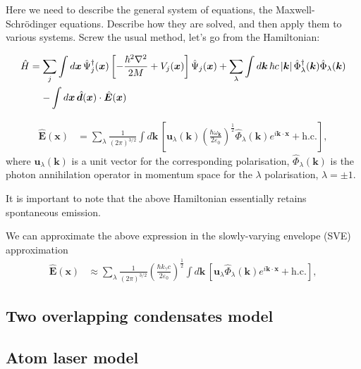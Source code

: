 Here we need to describe the general system of equations, the Maxwell-Schrödinger equations.  Describe how they are solved, and then apply them to various systems. Screw the usual method, let's go from the Hamiltonian:

\begin{align}
    \begin{split}
        \hat{H} &= \sum_j \int d \bm{x}\, \hat{\Psi}_j^\dagger(\bm{x}) \left[ - \frac{\hbar^2 \nabla^2}{2 M} + V_j(\bm{x}) \right] \hat{\Psi}_j(\bm{x}) + \sum_\lambda \int d \bm{k}\, \hbar c \abs{\bm{k}} \hat{\Phi}_\lambda^\dagger(\bm{k}) \hat{\Phi}_\lambda(\bm{k}) \\
        &\relphantom{=}- \int d \bm{x}\, \hat{\bm{d}}(\bm{x}) \cdot \hat{\bm{E}}(\bm{x})
    \end{split}
\end{align}

\begin{align}
    \hat{\bm{E}}(\bm{x}) &= \sum_\lambda \frac{1}{(2\pi)^{3/2}} \int d \bm{k}\, \left[\bm{u}_\lambda(\bm{k}) \left(\frac{\hbar \omega_{\bm{k}}}{2\varepsilon_0} \right)^{\frac{1}{2}} \hat{\Phi}_\lambda(\bm{k}) e^{i \bm{k} \cdot \bm{x}} + \text{h.c.}\right],
\end{align}
where $\bm{u}_\lambda(\bm{k})$ is a unit vector for the corresponding polarisation, $\hat{\Phi}_\lambda(\bm{k})$ is the photon annihilation operator in momentum space for the $\lambda$ polarisation, $\lambda = \pm 1$.

It is important to note that the above Hamiltonian essentially retains spontaneous emission.

We can approximate the above expression in the slowly-varying envelope (SVE) approximation
\begin{align}
    \hat{\bm{E}}(\bm{x}) &\approx \sum_\lambda \frac{1}{(2\pi)^{3/2}} \left(\frac{\hbar k_\gamma c}{2\varepsilon_0} \right)^{\frac{1}{2}} \int d \bm{k}\, \left[\bm{u}_\lambda \hat{\Phi}_\lambda(\bm{k}) e^{i \bm{k} \cdot \bm{x}} + \text{h.c.}\right],
\end{align}

\subsection{Two overlapping condensates model}

\subsection{Atom laser model}

